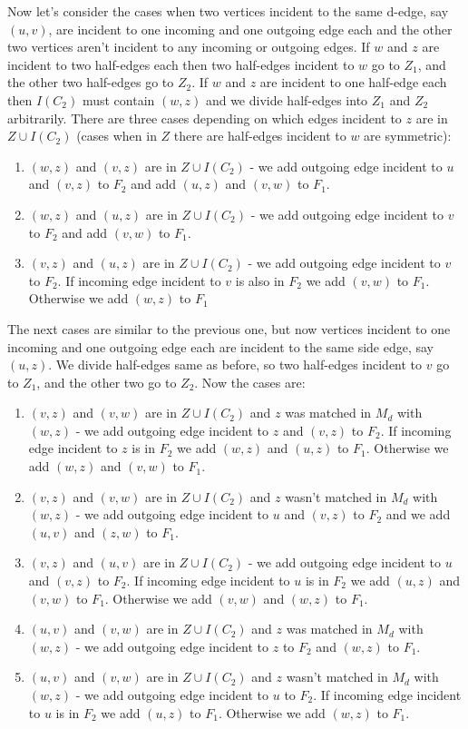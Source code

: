 \documentclass[a4, 11pt]{article}
\newcommand{\<}{\langle}
\renewcommand{\>}{\rangle}
\begin{document}
Now let's consider the cases when two vertices incident to the same d-edge, say $(u,v)$, are incident to one incoming and one outgoing edge each and the other two vertices aren't incident to any incoming or outgoing edges. If $w$ and $z$ are incident to two half-edges each then two half-edges incident to $w$ go to $Z_1$, and the other two half-edges go to $Z_2$. If $w$ and $z$ are incident to one half-edge each then $I(C_2)$ must contain $(w,z)$ and we divide half-edges into $Z_1$ and $Z_2$ arbitrarily. There are three cases depending on which edges incident to $z$ are in $Z \cup I(C_2)$ (cases when in $Z$ there are half-edges incident to $w$ are symmetric):
\begin{enumerate}
	\item $(w,z)$ and $(v,z)$ are in $Z \cup I(C_2)$ - we add outgoing edge incident to $u$ and $(v,z)$ to $F_2$ and add $(u,z)$ and $(v,w)$ to $F_1$.
	\item $(w,z)$ and $(u,z)$ are in $Z \cup I(C_2)$ - we add outgoing edge incident to $v$ to $F_2$ and add $(v,w)$ to $F_1$.
	\item $(v,z)$ and $(u,z)$ are in $Z \cup I(C_2)$ - we add outgoing edge incident to $v$ to $F_2$. If incoming edge incident to $v$ is also in $F_2$ we add $(v,w)$ to $F_1$. Otherwise we add $(w,z)$ to $F_1$
\end{enumerate}

The next cases are similar to the previous one, but now vertices incident to one incoming and one outgoing edge each are incident to the same side edge, say $(u,z)$. We divide half-edges same as before, so two half-edges incident to $v$ go to $Z_1$, and the other two go to $Z_2$. Now the cases are:
\begin{enumerate}
	\item $(v,z)$ and $(v,w)$ are in $Z \cup I(C_2)$ and $z$ was matched in $M_d$ with $(w,z)$ - we add outgoing edge incident to $z$ and $(v,z)$ to $F_2$. If incoming edge incident to $z$ is in $F_2$ we add $(w,z)$ and $(u,z)$ to $F_1$. Otherwise we add $(w,z)$ and $(v,w)$ to $F_1$.
	\item $(v,z)$ and $(v,w)$ are in $Z \cup I(C_2)$ and $z$ wasn't matched in $M_d$ with $(w,z)$ - we add outgoing edge incident to $u$ and $(v,z)$ to $F_2$ and we add $(u,v)$ and $(z,w)$ to $F_1$.
	\item $(v,z)$ and $(u,v)$ are in $Z \cup I(C_2)$ - we add outgoing edge incident to $u$ and $(v,z)$ to $F_2$. If incoming edge incident to $u$ is in $F_2$ we add $(u,z)$ and $(v,w)$ to $F_1$. Otherwise we add $(v,w)$ and $(w,z)$ to $F_1$.
	\item $(u,v)$ and $(v,w)$ are in $Z \cup I(C_2)$ and $z$ was matched in $M_d$ with $(w,z)$ - we add outgoing edge incident to $z$ to $F_2$ and $(w,z)$ to $F_1$.
	\item $(u,v)$ and $(v,w)$ are in $Z \cup I(C_2)$ and $z$ wasn't matched in $M_d$ with $(w,z)$ - we add outgoing edge incident to $u$ to $F_2$. If incoming edge incident to $u$ is in $F_2$ we add $(u,z)$ to $F_1$. Otherwise we add $(w,z)$ to $F_1$.
\end{enumerate}
\end{document}
